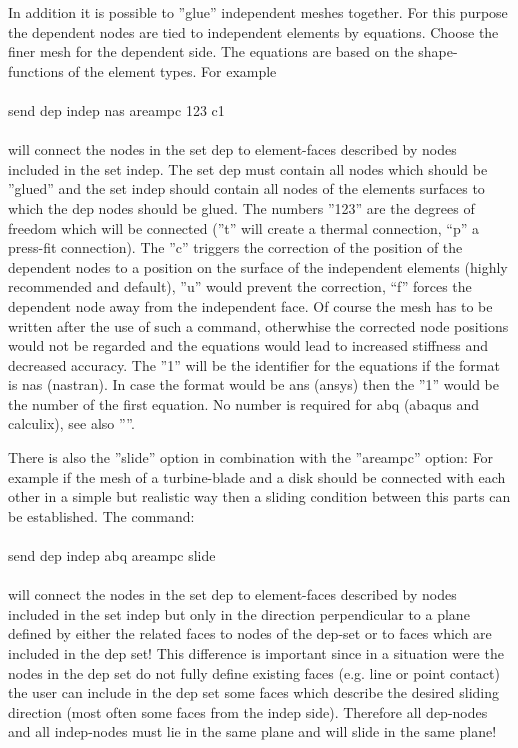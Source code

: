\documentclass{article}
\begin{document}
In addition it is possible to ''glue'' independent meshes together. For this purpose the dependent nodes are tied to independent elements by equations. Choose the finer mesh for the dependent side. The equations are based on the shape-functions of the element types. For example\\\\send dep indep nas areampc 123 c1\\\\will connect the nodes in the set dep to element-faces described by nodes included in the set indep. The set dep must contain all nodes which should be ''glued'' and the set indep should contain all nodes of the elements surfaces to which the dep nodes should be glued. The numbers ''123'' are the degrees of freedom which will be connected (''t'' will create a thermal connection, ``p'' a press-fit connection). The ''c'' triggers the correction of the position of the dependent nodes to a position on the surface of the independent elements (highly recommended and default), ''u'' would prevent the correction, ``f'' forces the dependent node away from the independent face. Of course the mesh has to be written after the use of such a command, otherwhise the corrected node positions would not be regarded and the equations would lead to increased stiffness and decreased accuracy. The ''1'' will be the identifier for the equations if the format is nas (nastran). In case the format would be ans (ansys) then the ''1'' would be the number of the first equation. No number is required for abq (abaqus and calculix), see also ''''.

There is also the ''slide'' option in combination with the ''areampc'' option: For example if the mesh of a turbine-blade and a disk should be connected with each other in a simple but realistic way then a sliding condition between this parts can be established. The command:\\\\send dep indep abq areampc slide\\\\will connect the nodes in the set dep to element-faces described by nodes included in the set indep but only in the direction perpendicular to a plane defined by either the related faces to nodes of the dep-set or to faces which are included in the dep set! This difference is important since in a situation were the nodes in the dep set do not fully define existing faces (e.g. line or point contact) the user can include in the dep set some faces which describe the desired sliding direction (most often some faces from the indep side). Therefore all dep-nodes and all indep-nodes must lie in the same plane and will slide in the same plane!\\
\end{document}
